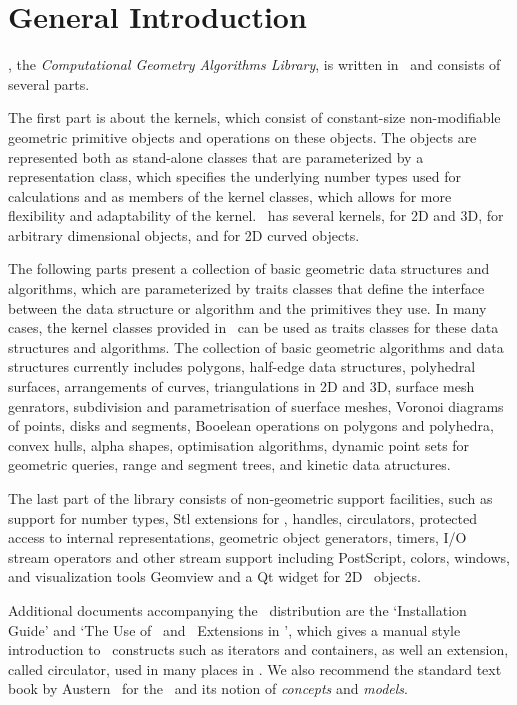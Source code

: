 
\chapter{General Introduction}

\cgal, the {\em Computational Geometry Algorithms Library}, is written in 
\CC\ and consists of several parts.

The first part is about the kernels, which consist of constant-size non-modifiable 
geometric primitive objects and operations on these objects. 
The objects are represented both as stand-alone classes that are
parameterized by a representation class, which specifies
the underlying number types used for calculations and as members of the
kernel classes, which allows for more flexibility and adaptability of the 
kernel.  \cgal\ has several kernels, for 2D and 3D, for arbitrary dimensional
objects, and for 2D curved objects.

The following parts present a collection of basic geometric data structures and
algorithms, which are parameterized by traits classes that define the 
interface between the data structure or algorithm and the primitives they use.
In many cases, the kernel classes provided in \cgal\ can be used as traits
classes for these data structures and algorithms.
The collection of basic geometric algorithms and data structures
currently includes polygons, half-edge data structures, polyhedral surfaces, 
arrangements of curves, triangulations in 2D and 3D,  surface mesh
genrators, subdivision and parametrisation of suerface meshes,
Voronoi diagrams of points, disks and segments, Booelean operations on polygons and polyhedra,
convex hulls, alpha shapes, optimisation algorithms, dynamic
point sets for geometric queries,  range and segment trees, and 
kinetic data atructures.

The last part of the library consists of non-geometric support
facilities, such as support for number types, {\sc Stl} extensions for
\cgal, handles, circulators, protected access to internal
representations, geometric object generators, timers, I/O stream
operators and other stream support including PostScript, colors,
windows, and visualization tools Geomview and a Qt widget for
2D \cgal\ objects.

Additional documents accompanying the \cgal\ distribution are the
`Installation Guide' and `The Use of \stl\ and \stl\ Extensions in
\cgal', which gives a manual style introduction to \stl\ constructs
such as iterators and containers, as well an extension, called
circulator, used in many places in \cgal. We also recommend the
standard text book by Austern~\cite{cgal:a-gps-98} for the \stl\ and
its notion of \emph{concepts} and \emph{models}.


